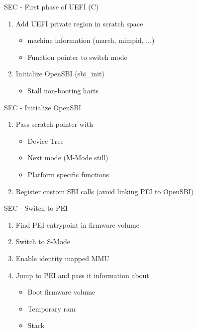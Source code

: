 \documentclass[
  10pt
]{beamer}
\begin{document}
\begin{frame}{SEC - First phase of UEFI (C)}
  \begin{enumerate}
    \item Add UEFI private region in scratch space
    \begin{itemize}
      \item machine information (march, mimpid, ...)
      \item Function pointer to switch mode
    \end{itemize}
    \item Initialize OpenSBI (sbi\_init)
    \begin{itemize}
      \item Stall non-booting harts
    \end{itemize}
  \end{enumerate}
\end{frame}

\begin{frame}{SEC - Initialize OpenSBI}
  \begin{enumerate}
    \item Pass scratch pointer with
    \begin{itemize}
      \item Device Tree %
      \item Next mode (M-Mode still)
      \item Platform specific functions
    \end{itemize}
    \item Register custom SBI calls (avoid linking PEI to OpenSBI)
  \end{enumerate}
\end{frame}

\begin{frame}{SEC - Switch to PEI}
  \begin{enumerate} %
    \item Find PEI entrypoint in firmware volume
    \item Switch to S-Mode
    \item Enable identity mapped MMU
    \item Jump to PEI and pass it information about
    \begin{itemize}
      \item Boot firmware volume
      \item Temporary ram
      \item Stack
    \end{itemize}
  \end{enumerate}
\end{frame}
\end{document}
